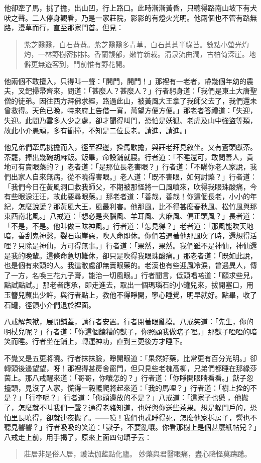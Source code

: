他卻牽了馬，挑了擔，出山凹，行上路口。此時漸漸黃昏，只聽得路南山坡下有犬吠之聲。二人停身觀看，乃是一家莊院，影影的有燈火光明。他兩個也不管有路無路，漫草而行，直至那家門首。但見：
\begin{quote}
紫芝翳翳，白石蒼蒼。紫芝翳翳多青草，白石蒼蒼半綠苔。數點小螢光灼灼，一林野樹密排排。香蘭馥郁，嫩竹新栽。清泉流曲澗，古柏倚深崖。地僻更無遊客到，門前惟有野花開。
\end{quote}

他兩個不敢擅入，只得叫一聲：「開門，開門！」那裡有一老者，帶幾個年幼的農夫，叉鈀掃帚齊來，問道：「甚麼人？甚麼人？」行者躬身道：「我們是東土大唐聖僧的徒弟。因往西方拜佛求經，路過此山，被黃風大王拿了我師父去了，我們還未曾救得。天色已晚，特來府上告借一宵，萬望方便方便。」那老者答禮道：「失迎，失迎。此間乃雲多人少之處，卻才聞得叫門，恐怕是妖狐、老虎及山中強盜等類，故此小介愚頑，多有衝撞，不知是二位長老。請進，請進。」

他兄弟們牽馬挑擔而入，徑至裡邊，拴馬歇擔，與莊老拜見敘坐。又有蒼頭獻茶。茶罷，捧出幾碗胡麻飯。飯畢，命設鋪就寢。行者道：「不睡還可，敢問善人，貴地可有賣眼藥的？」老者道：「是那位長老害眼？」行者道：「不瞞你老人家說，我們出家人自來無病，從不曉得害眼。」老人道：「既不害眼，如何討藥？」行者道：「我們今日在黃風洞口救我師父，不期被那怪將一口風噴來，吹得我眼珠酸痛，今有些眼淚汪汪，故此要尋眼藥。」那老者道：「善哉，善哉！你這個長老，小小的年紀，怎麼說謊？那黃風大王，風最利害。他那風，比不得甚麼春秋風、松竹風與那東西南北風。」八戒道：「想必是夾腦風、羊耳風、大麻風、偏正頭風？」長者道：「不是，不是。他叫做三昧神風。」行者道：「怎見得？」老者道：「那風能吹天地暗，善刮鬼神愁，裂石崩崖惡，吹人命即休。你們若遇著他那風吹了時，還想得活哩？只除是神仙，方可得無事。」行者道：「果然，果然。我們雖不是神仙，神仙還是我的晚輩。這條命急切難休，卻只是吹得我眼珠酸痛。」那老者道：「既如此說，也是個有來頭的人。我這敝處卻無賣眼藥的。老漢也有些迎風冷淚，曾遇異人，傳了一方，名喚三花九子膏，能治一切風眼。」行者聞言，低頭唱喏道：「願求些兒，點試點試。」那老者應承，即走進去，取出一個瑪瑙石的小罐兒來，拔開塞口，用玉簪兒蘸出少許，與行者點上，教他不得睜開，寧心睡覺，明早就好。點畢，收了石罐，徑領小介們退於裡面。

八戒解包袱，展開鋪蓋，請行者安置。行者閉著眼亂摸。八戒笑道：「先生，你的明杖兒呢？」行者道：「你這個饢糟的獃子，你照顧我做瞎子哩。」那獃子啞啞的暗笑而睡。行者坐在鋪上，轉運神功，直到三更後方才睡下。

不覺又是五更將曉。行者抹抹臉，睜開眼道：「果然好藥，比常更有百分光明。」卻轉頭後邊望望，呀！那裡得甚房舍窗門，但只見些老槐高柳，兄弟們都睡在那綠莎茵上。那八戒醒來道：「哥哥，你嚷怎的？」行者道：「你睜開眼睛看看。」獃子忽擡頭，見沒了人家，慌得一轂轆爬將起來道：「我的馬哩？」行者道：「樹上拴的不是？」「行李呢？」行者道：「你頭邊放的不是？」八戒道：「這家子也憊𪬯，他搬了，怎麼就不叫我們一聲？通得老豬知道，也好與你送些茶果。想是躲門戶的，恐怕里長曉得，卻就連夜搬了。——噫！我們也忒睡得死，怎麼他家拆房子，響也不聽見響響？」行者吸吸的笑道：「獃子，不要亂嚷。你看那樹上是個甚麼紙帖兒？」八戒走上前，用手揭了，原來上面四句頌子云：
\begin{quote}
莊居非是俗人居，護法伽藍點化廬。
妙藥與君醫眼痛，盡心降怪莫躊躇。
\end{quote}

